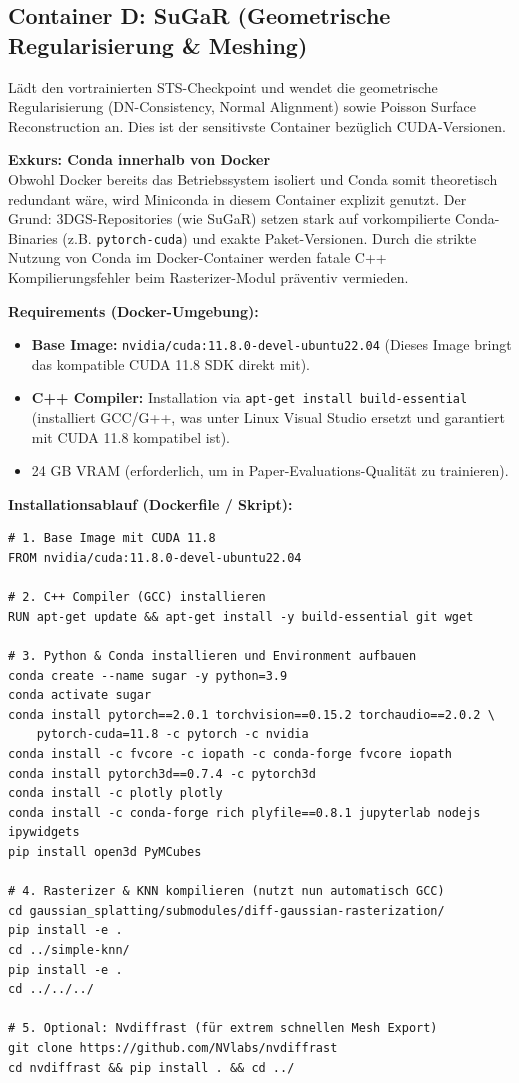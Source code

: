 \documentclass[12pt,a4paper]{article}
\begin{document}
\subsection*{Container D: SuGaR (Geometrische Regularisierung \& Meshing)}
Lädt den vortrainierten STS-Checkpoint und wendet die geometrische Regularisierung (DN-Consistency, Normal Alignment) sowie Poisson Surface Reconstruction an. Dies ist der sensitivste Container bezüglich CUDA-Versionen.

\textbf{Exkurs: Conda innerhalb von Docker}\\
Obwohl Docker bereits das Betriebssystem isoliert und Conda somit theoretisch redundant wäre, wird Miniconda in diesem Container explizit genutzt. Der Grund: 3DGS-Repositories (wie SuGaR) setzen stark auf vorkompilierte Conda-Binaries (z.B. \texttt{pytorch-cuda}) und exakte Paket-Versionen. Durch die strikte Nutzung von Conda im Docker-Container werden fatale C++ Kompilierungsfehler beim Rasterizer-Modul präventiv vermieden.

\textbf{Requirements (Docker-Umgebung):}
\begin{itemize}[noitemsep]
    \item \textbf{Base Image:} \texttt{nvidia/cuda:11.8.0-devel-ubuntu22.04} (Dieses Image bringt das kompatible CUDA 11.8 SDK direkt mit).
    \item \textbf{C++ Compiler:} Installation via \texttt{apt-get install build-essential} (installiert GCC/G++, was unter Linux Visual Studio ersetzt und garantiert mit CUDA 11.8 kompatibel ist).
    \item 24 GB VRAM (erforderlich, um in Paper-Evaluations-Qualität zu trainieren).
\end{itemize}

\textbf{Installationsablauf (Dockerfile / Skript):}
\begin{verbatim}
# 1. Base Image mit CUDA 11.8
FROM nvidia/cuda:11.8.0-devel-ubuntu22.04

# 2. C++ Compiler (GCC) installieren
RUN apt-get update && apt-get install -y build-essential git wget

# 3. Python & Conda installieren und Environment aufbauen
conda create --name sugar -y python=3.9
conda activate sugar
conda install pytorch==2.0.1 torchvision==0.15.2 torchaudio==2.0.2 \
    pytorch-cuda=11.8 -c pytorch -c nvidia
conda install -c fvcore -c iopath -c conda-forge fvcore iopath
conda install pytorch3d==0.7.4 -c pytorch3d
conda install -c plotly plotly
conda install -c conda-forge rich plyfile==0.8.1 jupyterlab nodejs ipywidgets
pip install open3d PyMCubes

# 4. Rasterizer & KNN kompilieren (nutzt nun automatisch GCC)
cd gaussian_splatting/submodules/diff-gaussian-rasterization/
pip install -e .
cd ../simple-knn/
pip install -e .
cd ../../../

# 5. Optional: Nvdiffrast (für extrem schnellen Mesh Export)
git clone https://github.com/NVlabs/nvdiffrast
cd nvdiffrast && pip install . && cd ../
\end{verbatim}
\end{document}
